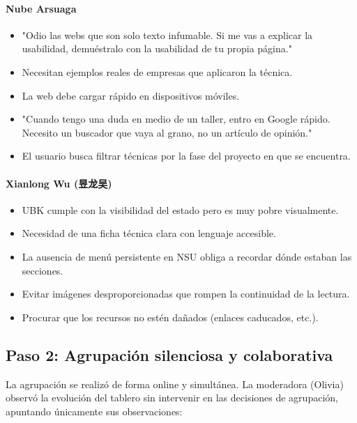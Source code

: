 \documentclass[12pt, a4paper]{report}
\begin{document}
\paragraph{Nube Arsuaga}
\begin{itemize}[nosep]
  \item "Odio las webs que son solo texto infumable. Si me vas a explicar la usabilidad, demuéstralo
    con la usabilidad de tu propia página."
  \item Necesitan ejemplos reales de empresas que aplicaron la técnica.
  \item La web debe cargar rápido en dispositivos móviles.
  \item "Cuando tengo una duda en medio de un taller, entro en Google rápido. Necesito un buscador
    que vaya al grano, no un artículo de opinión."
  \item El usuario busca filtrar técnicas por la fase del proyecto en que se encuentra.
\end{itemize}

\paragraph{Xianlong Wu (昱龙吴)}
\begin{itemize}[nosep]
  \item UBK cumple con la visibilidad del estado pero es muy pobre visualmente.
  \item Necesidad de una ficha técnica clara con lenguaje accesible.
  \item La ausencia de menú persistente en NSU obliga a recordar dónde estaban las secciones.
  \item Evitar imágenes desproporcionadas que rompen la continuidad de la lectura.
  \item Procurar que los recursos no estén dañados (enlaces caducados, etc.).
\end{itemize}

\subsection{Paso 2: Agrupación silenciosa y colaborativa}

La agrupación se realizó de forma online y simultánea. La moderadora (Olivia) observó la
evolución del tablero sin intervenir en las decisiones de agrupación, apuntando únicamente
sus observaciones:
\end{document}
